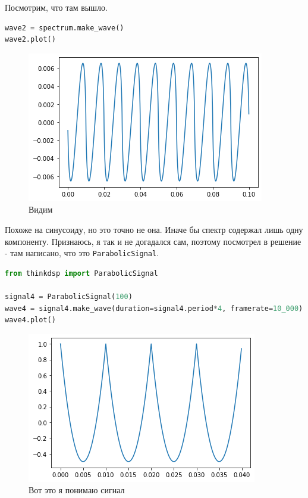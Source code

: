 \documentclass[a4paper,12pt]{report}
\begin{document}
    Посмотрим, что там вышло.
    
\begin{lstlisting}[language=Python,caption=Смотрим]
wave2 = spectrum.make_wave()
wave2.plot()
\end{lstlisting}

    \begin{figure}[H]
        \centering
        \includegraphics[width=\textwidth]{ex6_second.png}
        \caption{Видим}
        \label{fig:ex6_second}
    \end{figure}
    
    Похоже на синусоиду, но это точно не она. Иначе бы спектр содержал лишь одну компоненту. Признаюсь, я так и не догадался сам, поэтому посмотрел в решение - там написано, что это \texttt{ParabolicSignal}.
    
\begin{lstlisting}[language=Python,caption=Что же это за сигнал такой...]
from thinkdsp import ParabolicSignal

signal4 = ParabolicSignal(100)
wave4 = signal4.make_wave(duration=signal4.period*4, framerate=10_000)
wave4.plot()
\end{lstlisting}

    \begin{figure}[H]
        \centering
        \includegraphics[width=\textwidth]{ex6_third.png}
        \caption{Вот это я понимаю сигнал}
        \label{fig:ex6_third}
    \end{figure}
\end{document}
